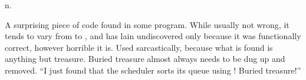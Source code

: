  n.

A surprising piece of code found in some program. While usually not wrong, it
tends to vary from  to , and has lain
undiscovered only because it was functionally correct, however horrible it is.
Used sarcastically, because what is found is anything but treasure. Buried
treasure almost always needs to be dug up and removed. ``I just found that the
scheduler sorts its queue using ! Buried treasure!''

